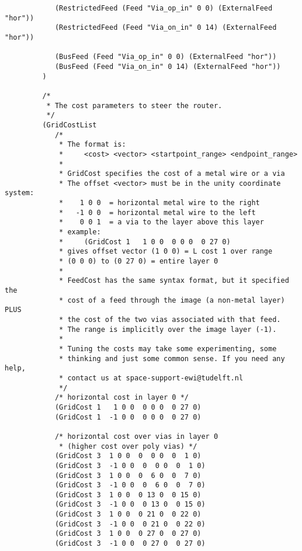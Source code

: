 {\begin{verbatim}
            (RestrictedFeed (Feed "Via_op_in" 0 0) (ExternalFeed "hor"))
            (RestrictedFeed (Feed "Via_on_in" 0 14) (ExternalFeed "hor"))

            (BusFeed (Feed "Via_op_in" 0 0) (ExternalFeed "hor"))
            (BusFeed (Feed "Via_on_in" 0 14) (ExternalFeed "hor"))
         )

         /*
          * The cost parameters to steer the router.
          */
         (GridCostList
            /* 
             * The format is:
             *     <cost> <vector> <startpoint_range> <endpoint_range>
             *
             * GridCost specifies the cost of a metal wire or a via
             * The offset <vector> must be in the unity coordinate system:
             *    1 0 0  = horizontal metal wire to the right
             *   -1 0 0  = horizontal metal wire to the left
             *    0 0 1  = a via to the layer above this layer
             * example:
             *     (GridCost 1   1 0 0  0 0 0  0 27 0) 
             * gives offset vector (1 0 0) = L cost 1 over range 
             * (0 0 0) to (0 27 0) = entire layer 0
             *
             * FeedCost has the same syntax format, but it specified the
             * cost of a feed through the image (a non-metal layer) PLUS
             * the cost of the two vias associated with that feed.
             * The range is implicitly over the image layer (-1).
             * 
             * Tuning the costs may take some experimenting, some 
             * thinking and just some common sense. If you need any help, 
             * contact us at space-support-ewi@tudelft.nl
             */
            /* horizontal cost in layer 0 */
            (GridCost 1   1 0 0  0 0 0  0 27 0)
            (GridCost 1  -1 0 0  0 0 0  0 27 0)
 
            /* horizontal cost over vias in layer 0 
             * (higher cost over poly vias) */
            (GridCost 3  1 0 0  0  0 0  0  1 0)
            (GridCost 3  -1 0 0  0  0 0  0  1 0) 
            (GridCost 3  1 0 0  0  6 0  0  7 0)
            (GridCost 3  -1 0 0  0  6 0  0  7 0)
            (GridCost 3  1 0 0  0 13 0  0 15 0)
            (GridCost 3  -1 0 0  0 13 0  0 15 0)
            (GridCost 3  1 0 0  0 21 0  0 22 0) 
            (GridCost 3  -1 0 0  0 21 0  0 22 0)
            (GridCost 3  1 0 0  0 27 0  0 27 0)
            (GridCost 3  -1 0 0  0 27 0  0 27 0)


\end{verbatim}}
